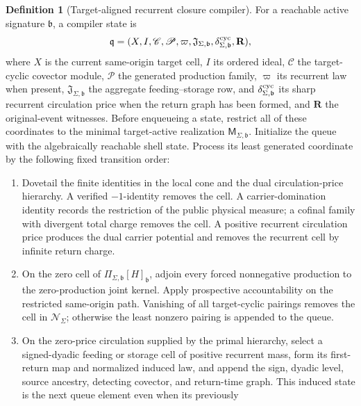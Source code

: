 \documentclass[11pt]{article}
\numberwithin{section}{part}
\theoremstyle{plain}
\theoremstyle{definition}
\newtheorem{definition}[definition]{Definition}
\theoremstyle{remark}
\newcommand{\Null}{\mathscr N}
\begin{document}
\begin{definition}[Target-aligned recurrent closure compiler]
\label{def:target-aligned-recurrent-closure-compiler}
For a reachable active signature \(\mathfrak b\), a compiler state is
\begin{equation}
 \label{eq:target-aligned-compiler-state}
 \mathfrak q=(X,I,\mathscr C,\mathscr P,\varpi,
              \mathfrak J_{\Sigma,\mathfrak b},
              \delta^{\rm cyc}_{\Sigma,\mathfrak b},\mathbf R),
\end{equation}
where \(X\) is the current same-origin target cell, \(I\) its ordered ideal,
\(\mathscr C\) the target-cyclic covector module, \(\mathscr P\) the generated
production family, \(\varpi\) its recurrent law when present,
\(\mathfrak J_{\Sigma,\mathfrak b}\) the aggregate feeding--storage row, and
\(\delta^{\rm cyc}_{\Sigma,\mathfrak b}\) its sharp recurrent circulation
price when the return graph has been formed, and \(\mathbf R\) the
original-event witnesses.  Before enqueueing a state, restrict all of these
coordinates to the minimal target-active realization
\(\mathsf M_{\Sigma,\mathfrak b}\).  Initialize the queue with the
algebraically reachable shell state.  Process its least generated coordinate by the
following fixed transition order:
\begin{enumerate}[label=\textup{(Q\arabic*)}]
\item Dovetail the finite identities in the local cone and the dual
circulation-price hierarchy.  A verified
\(-1\)-identity removes the cell.  A carrier-domination identity records the
restriction of the public physical measure; a cofinal family with divergent
total charge removes the cell.  A positive recurrent circulation price
produces the dual carrier potential and removes the recurrent cell by
infinite return charge.
\item On the zero cell of
\(\Pi_{\Sigma,\mathfrak b}[H]_{\mathfrak b}\), adjoin every forced
nonnegative production to the zero-production joint kernel.  Apply
prospective accountability on the restricted same-origin path.  Vanishing of
all target-cyclic pairings removes the cell in \(\Null_\Sigma\); otherwise
the least nonzero pairing is appended to the queue.
\item On the zero-price circulation supplied by the primal hierarchy, select
a signed-dyadic feeding or storage cell of positive recurrent mass, form its
first-return map and normalized induced law, and append the sign,
dyadic level, source ancestry, detecting covector, and return-time graph.
This induced state is the next queue element even when its previously

\end{enumerate}
\end{definition}
\end{document}
